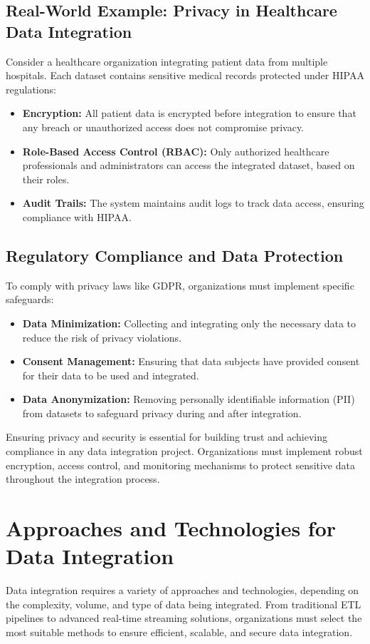 \documentclass[12pt]{article}
\begin{document}
\subsection{Real-World Example: Privacy in Healthcare Data Integration}
Consider a healthcare organization integrating patient data from multiple hospitals. Each dataset contains sensitive medical records protected under HIPAA regulations:
\begin{itemize}
    \item \textbf{Encryption:} All patient data is encrypted before integration to ensure that any breach or unauthorized access does not compromise privacy.
    \item \textbf{Role-Based Access Control (RBAC):} Only authorized healthcare professionals and administrators can access the integrated dataset, based on their roles.
    \item \textbf{Audit Trails:} The system maintains audit logs to track data access, ensuring compliance with HIPAA.
\end{itemize}

\subsection{Regulatory Compliance and Data Protection}
To comply with privacy laws like GDPR, organizations must implement specific safeguards:
\begin{itemize}
    \item \textbf{Data Minimization:} Collecting and integrating only the necessary data to reduce the risk of privacy violations.
    \item \textbf{Consent Management:} Ensuring that data subjects have provided consent for their data to be used and integrated.
    \item \textbf{Data Anonymization:} Removing personally identifiable information (PII) from datasets to safeguard privacy during and after integration.
\end{itemize}

Ensuring privacy and security is essential for building trust and achieving compliance in any data integration project. Organizations must implement robust encryption, access control, and monitoring mechanisms to protect sensitive data throughout the integration process.

\section{Approaches and Technologies for Data Integration}
Data integration requires a variety of approaches and technologies, depending on the complexity, volume, and type of data being integrated. From traditional ETL pipelines to advanced real-time streaming solutions, organizations must select the most suitable methods to ensure efficient, scalable, and secure data integration.
\end{document}
